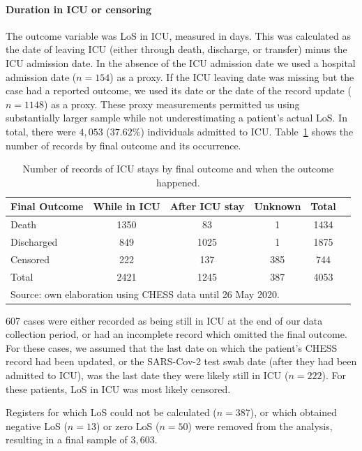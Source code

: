 \documentclass[review]{elsarticle}
\begin{document}
\paragraph{Duration in ICU or censoring} The outcome variable was LoS in ICU, measured in days. This was calculated as the date of leaving ICU (either through death, discharge, or transfer) minus the ICU admission date. In the absence of the ICU admission date we used a hospital admission date ($n = 154$) as a proxy. If the ICU leaving date was missing but the case had a reported outcome, we used its date or the date of the record update ($n = 1148$) as a proxy. These proxy measurements permitted us using substantially larger sample while not underestimating a patient's actual LoS. In total, there were $4,053$ ($37.62\%$) individuals admitted to ICU. Table~\ref{Table:ICU_outcome} shows the number of records by final outcome and its occurrence.

\begin{table}[ht]
\centering
\caption{Number of records of ICU stays by final outcome and when the outcome happened. \label{Table:ICU_outcome}}
\begin{tabular}[t]{lccccc}
\toprule
Final Outcome & While in ICU & After ICU stay& Unknown & Total\\
\midrule

Death&1350&83&1&1434\\
Discharged&849&1025&1&1875\\
Censored&222&137&385&744\\
\bottomrule
Total&2421&1245&387&4053\\
\bottomrule
\multicolumn{5}{l}{\scriptsize{Source: own elaboration using CHESS data  until 26 May 2020.}}
\end{tabular}
\end{table}%

607 cases were either recorded as being still in ICU at the end of our data collection period, or had an incomplete record which omitted the final outcome. For these cases, we assumed that the last date on which the patient’s CHESS record had been updated, or the SARS-Cov-2 test swab date (after they had been admitted to ICU), was the last date they were likely still in ICU ($n = 222$). For these patients, LoS in ICU was most likely censored.

Registers for which LoS could not be calculated ($n = 387$), or which obtained negative LoS ($n = 13$) or zero LoS ($n = 50$) were removed from the analysis, resulting in a final sample of $3,603$.
\end{document}
